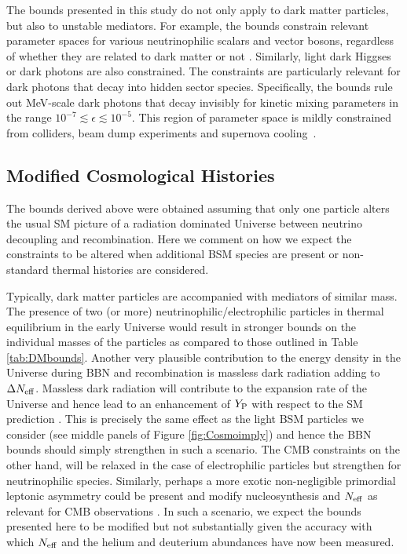 \documentclass[notitlepage,letterpaper,natbib,aps,prd,onecolumn,amsmath,amsfonts,nofootinbib,preprintnumbers,superscriptaddress,secnumarabic,groupedaddress]{revtex4-1}
\begin{document}
The bounds presented in this study do not only apply to dark matter particles, but also to unstable mediators. For example, the bounds constrain relevant parameter spaces for various neutrinophilic scalars and vector bosons, regardless of whether they are related to dark matter \cite{Blennow:2019fhy,Kelly:2019wow} or not \cite{Blinov:2019gcj}. Similarly, light dark Higgses or dark photons are also constrained. The constraints are particularly relevant for dark photons that decay into hidden sector species. Specifically, the bounds rule out MeV-scale dark photons that decay invisibly for kinetic mixing parameters in the range $10^{-7} \lesssim \epsilon \lesssim 10^{-5}$. This region of parameter space is mildly constrained from colliders, beam dump experiments and supernova cooling~\cite{Ilten:2018crw,Bauer:2018onh,Chang:2018rso}. 

\subsection{Modified Cosmological Histories} 

The bounds derived above were obtained assuming that only one particle alters the usual SM picture of a radiation dominated Universe between neutrino decoupling and recombination. Here we comment on how we expect the constraints to be altered when additional BSM species are present or non-standard thermal histories are considered.  

Typically, dark matter particles are accompanied with mediators of similar mass. The presence of two (or more) neutrinophilic/electrophilic particles in thermal equilibrium in the early Universe would result in stronger bounds on the individual masses of the particles as compared to those outlined in Table \ref{tab:DMbounds}. Another very plausible contribution to the energy density in the Universe during BBN and recombination is massless dark radiation adding to $\Delta N_{\rm eff}$. Massless dark radiation will contribute to the expansion rate of the Universe and hence lead to an enhancement of $Y_{\rm P}$ with respect to the SM prediction \cite{Sarkar:1995dd,Iocco:2008va,Pospelov:2010hj}. This is precisely the same effect as the light BSM particles we consider (see middle panels of Figure \ref{fig:Cosmoimply}) and hence the BBN bounds should simply strengthen in such a scenario. The CMB constraints on the other hand, will be relaxed in the case of electrophilic particles \cite{Steigman:2013yua} but strengthen for neutrinophilic species. Similarly, perhaps a more exotic non-negligible primordial leptonic asymmetry could be present and modify nucleosynthesis and $N_{\rm eff}$ as relevant for CMB observations \cite{Dolgov:2002wy}. In such a scenario, we expect the bounds presented here to be modified \cite{Berezhiani:2012ru} but not substantially given the accuracy with which $N_{\rm eff}$ and the helium and deuterium abundances have now been measured.
\end{document}
